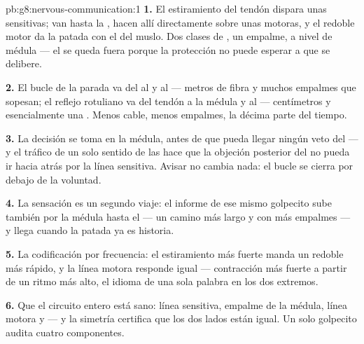 \begin{solution}{pb:g8:nervous-communication:1}
\textbf{1.} El estiramiento del tendón dispara unas 
sensitivas; van hasta la \emph{}, hacen  allí
directamente sobre unas  motoras, y el redoble motor da la
patada con el  del muslo. Dos clases de , un empalme, a
nivel de médula --- el  se queda fuera porque la protección no
puede esperar a que se delibere.

\textbf{2.} El bucle de la parada va del  al  y al  ---
metros de fibra y muchos empalmes que sopesan; el reflejo rotuliano va
del tendón a la médula y al  --- centímetros y esencialmente una
. Menos cable, menos empalmes, la décima parte del tiempo.

\textbf{3.} La decisión se toma en la médula, antes de que pueda llegar
ningún veto del  --- y el tráfico de un solo sentido de las
 hace que la objeción posterior del  no pueda ir hacia
atrás por la línea sensitiva. Avisar no cambia nada: el bucle se cierra
por debajo de la voluntad.

\textbf{4.} La sensación es un segundo viaje: el informe de ese mismo
golpecito sube también por la médula hasta el  --- un camino más
largo y con más empalmes --- y llega cuando la patada ya es historia.

\textbf{5.} La codificación por frecuencia: el estiramiento más fuerte
manda un redoble más rápido, y la línea motora responde igual ---
contracción más fuerte a partir de un ritmo más alto, el idioma de una
sola palabra en los dos extremos.

\textbf{6.} Que el circuito entero está sano: línea sensitiva, empalme
de la médula, línea motora y  --- y la simetría certifica que
los dos lados están igual. Un solo golpecito audita cuatro componentes.


\end{solution}

